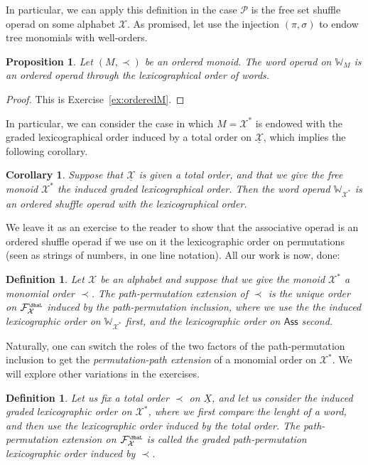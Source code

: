 \documentclass[fleqn, a4paper, twoside]{article}
\newcommand{\Sha}{{\scaleobj{0.75}{\ShaL}}}
\newcommand{\0}{\langle 0\rangle}
\newcommand{\XX}{\mathcal{X}}
\newcommand{\FF}{\mathcal{F}}
\DeclareRobustCommand{\[}{\begin{equation}}%
\DeclareRobustCommand{\]}{\end{equation}}%
\theoremstyle{mytheorem}
\newtheorem{proposition}[theorem]{Proposition}
\newtheorem{corollary}[theorem]{Corollary}
\theoremstyle{introthm}
\theoremstyle{mydefinition}
\newtheorem{definition}[theorem]{Definition}
\theoremstyle{mydefinition2}
\theoremstyle{plain} %
\newcommand{\?}{\,?\,}
\newcommand{\PP}{{\mathcal{P}}}
\theoremstyle{mytheorem}
\theoremstyle{plain} %
\begin{document}
In particular, we can apply this definition in the case $\PP$
is the free set shuffle operad on some alphabet $\XX$. As
promised, let use 
the injection $(\pi,\sigma)$ to endow tree monomials with
well-orders. 

\begin{proposition}
Let $(M,\prec)$ be an ordered monoid. The
word operad on $\mathbb W_M$ is an ordered operad
through the lexicographical order of words.
\end{proposition}

\begin{proof}
This is Exercise~\ref{ex:orderedM}.
\end{proof}

In particular, we can consider the case in which $M = \XX^*$
is endowed with the graded lexicographical order induced by
a total order on $\underline{\XX}$, which implies the following
corollary.

\begin{corollary}
Suppose that $\underline{\XX}$ is given a total order, and that
we give the free monoid $\XX^*$ the induced graded 
lexicographical order. Then
the word operad $\mathbb{W}_{\XX^*}$ is an ordered
shuffle operad with the lexicographical order.
\end{corollary}

We leave it as an exercise to the reader to show that the
associative operad is an ordered shuffle operad if we
use on it the lexicographic order on permutations
(seen as strings of numbers, in one line notation).
All our work is now, done:

\begin{definition}
Let $\XX$ be an alphabet and suppose that we
give the monoid $\XX^*$ a monomial order $\prec$.
The \emph{path-permutation extension} of $\prec$ is the
unique order on $\FF_{\XX}^\Sha$ induced by
the path-permutation inclusion, where we use the
the induced lexicographic
order on $\mathbb{W}_{\XX^*}$ first, and the
lexicographic order on $\mathsf{Ass}$ second.
\end{definition}

Naturally, one can switch the roles of the two
factors of the path-permutation inclusion to get
the \emph{permutation-path extension} of a monomial
order on $\XX^*$. We will explore other variations
in the exercises.

\begin{definition}
Let us fix a total order $\prec$ on $\underline{X}$, and let us
consider the induced graded lexicographic order on 
$\XX^*$, where we first compare the lenght of a 
word, and then use the lexicographic order induced
by the total order. The path-permutation extension 
on $\FF_\XX^\Sha$ is called the  \emph{graded path-permutation 
lexicographic order} induced by $\prec$.
\end{definition}
\end{document}
